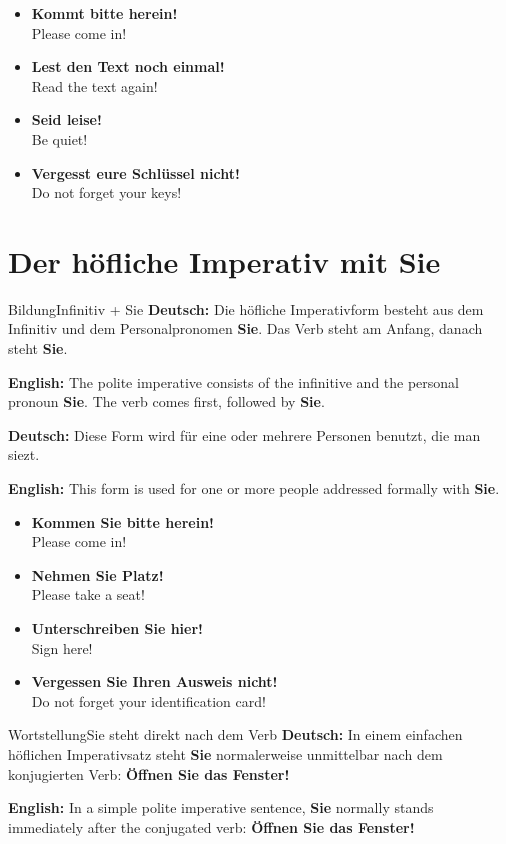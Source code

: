 \documentclass[a4paper,11pt]{article}
\newcommand{\GermanText}[1]{\textbf{Deutsch: }#1\par}
\newcommand{\EnglishText}[1]{{\small\color{SoftGray}\textbf{English: }#1\par}}
\newcommand{\ExampleItem}[2]{\item \textbf{#1}\\{\small\color{SoftGray}#2}}
\begin{document}
        \begin{exbox}
            \begin{itemize}
                \ExampleItem{Kommt bitte herein!}{Please come in!}
                \ExampleItem{Lest den Text noch einmal!}{Read the text again!}
                \ExampleItem{Seid leise!}{Be quiet!}
                \ExampleItem{Vergesst eure Schlüssel nicht!}{Do not forget your keys!}
            \end{itemize}
        \end{exbox}

    \section{Der höfliche Imperativ mit Sie}

        \begin{grammarentry}{Bildung}{Infinitiv + Sie}
            \GermanText{Die höfliche Imperativform besteht aus dem Infinitiv und dem Personalpronomen \textbf{Sie}. Das Verb steht am Anfang, danach steht \textbf{Sie}.}
            \EnglishText{The polite imperative consists of the infinitive and the personal pronoun \textbf{Sie}. The verb comes first, followed by \textbf{Sie}.}

            \GermanText{Diese Form wird für eine oder mehrere Personen benutzt, die man siezt.}
            \EnglishText{This form is used for one or more people addressed formally with \textbf{Sie}.}
        \end{grammarentry}

        \begin{exbox}
            \begin{itemize}
                \ExampleItem{Kommen Sie bitte herein!}{Please come in!}
                \ExampleItem{Nehmen Sie Platz!}{Please take a seat!}
                \ExampleItem{Unterschreiben Sie hier!}{Sign here!}
                \ExampleItem{Vergessen Sie Ihren Ausweis nicht!}{Do not forget your identification card!}
            \end{itemize}
        \end{exbox}

        \begin{grammarentry}{Wortstellung}{Sie steht direkt nach dem Verb}
            \GermanText{In einem einfachen höflichen Imperativsatz steht \textbf{Sie} normalerweise unmittelbar nach dem konjugierten Verb: \textbf{Öffnen Sie das Fenster!}}
            \EnglishText{In a simple polite imperative sentence, \textbf{Sie} normally stands immediately after the conjugated verb: \textbf{Öffnen Sie das Fenster!}}
        \end{grammarentry}
\end{document}
